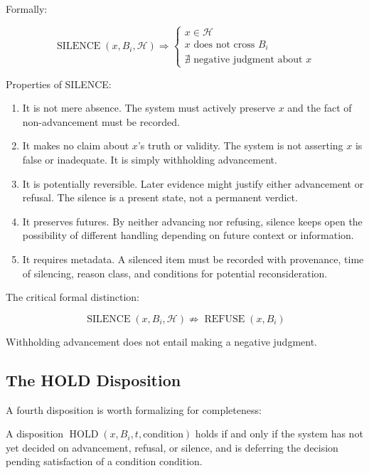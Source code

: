 \documentclass[12pt]{article}
\begin{document}
Formally:

\begin{equation}
\operatorname{SILENCE}(x, B_i, \mathcal{H}) \Rightarrow \begin{cases}
x \in \mathcal{H}\\
x \text{ does not cross } B_i\\
\nexists \text{ negative judgment about } x
\end{cases}
\end{equation}

Properties of SILENCE:
\begin{enumerate}
\item It is not mere absence. The system must actively preserve $x$ and the fact of non-advancement must be recorded.
\item It makes no claim about $x$'s truth or validity. The system is not asserting $x$ is false or inadequate. It is simply withholding advancement.
\item It is potentially reversible. Later evidence might justify either advancement or refusal. The silence is a present state, not a permanent verdict.
\item It preserves futures. By neither advancing nor refusing, silence keeps open the possibility of different handling depending on future context or information.
\item It requires metadata. A silenced item must be recorded with provenance, time of silencing, reason class, and conditions for potential reconsideration.
\end{enumerate}

The critical formal distinction:

\begin{equation}
\boxed{
\operatorname{SILENCE}(x, B_i, \mathcal{H}) \not\Rightarrow \operatorname{REFUSE}(x, B_i)
}
\end{equation}

Withholding advancement does not entail making a negative judgment.

\subsection{The HOLD Disposition}

A fourth disposition is worth formalizing for completeness:

\begin{definition}
A disposition $\operatorname{HOLD}(x, B_i, t, \text{condition})$ holds if and only if the system has not yet decided on advancement, refusal, or silence, and is deferring the decision pending satisfaction of a condition $\text{condition}$.
\end{definition}
\end{document}
